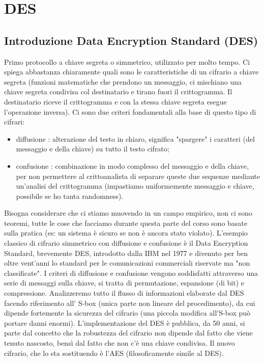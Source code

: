 \chapter{DES}

\section{Introduzione Data Encryption Standard (DES)}
Primo protocollo a chiave segreta o simmetrico, utilizzato per molto tempo. Ci spiega abbastanza chiaramente quali sono le caratteristiche di un cifrario a chiave segreta (funzioni matematiche che prendono un messaggio, ci mischiano una chiave segreta condivisa col destinatario e tirano fuori il crittogramma. Il destinatario riceve il crittogramma e con la stessa chiave segreta esegue l'operazione inversa). Ci sono due criteri fondamentali alla base di questo tipo di cifrari:
\begin{itemize}
	\item diffusione : alterazione del testo in chiaro, significa "spargere" i caratteri (del messaggio e della chiave) su tutto il testo cifrato;
	\item confusione : combinazione in modo complesso del messaggio e della chiave, per non permettere al crittoanalista di separare queste due sequenze mediante un'analisi del crittogramma (impastiamo uniformemente messaggio e chiave, possibile se ho tanta randomness).
\end{itemize}
Bisogna considerare che ci stiamo muovendo in un campo empirico, non ci sono teoremi, tutte le cose che facciamo durante questa parte del corso sono basate sulla pratica (es: un sistema è sicuro se non è ancora stato violato). L’esempio classico di cifrario simmetrico con diffusione e confusione è il Data Encryption Standard, brevemente
DES, introdotto dalla IBM nel 1977 e divenuto per ben oltre vent’anni lo standard per le comunicazioni commerciali riservate ma "non classificate". I criteri di diffusione e confusione vengono soddisfatti attraverso una serie di messaggi sulla chiave, si tratta di permutazione, espansione (di bit) e compressione. Analizzeremo tutto il flusso di informazioni elaborate dal DES facendo riferimento all' S-box (unica parte non lineare del procedimento), da cui dipende fortemente la sicurezza del cifrario (una piccola modifica all'S-box può portare danni enormi). L'implementazione del DES è pubblica, da 50 anni, si parte dal concetto che la robustezza del cifrario non dipende dal fatto che viene tenuto nascosto, bensì dal fatto che non c'è una chiave condivisa. Il nuovo cifrario, che lo sta sostituendo è l'AES (filosoficamente simile al DES).

